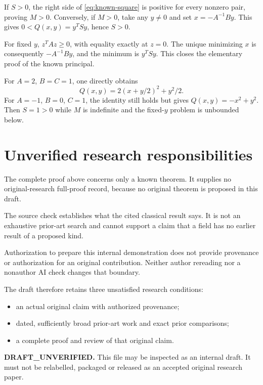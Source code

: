\documentclass[12pt,reqno]{amsart}
\begin{document}
If $S>0$, the right side of \eqref{eq:known-square} is positive for every
nonzero pair, proving $M>0$. Conversely, if $M>0$, take any $y\ne0$
and set $x=-A^{-1}By$. This gives $0<Q(x,y)=y^TSy$, hence $S>0$.

For fixed $y$, $z^TAz\geq0$, with equality exactly at $z=0$.
The unique minimizing $x$ is consequently $-A^{-1}By$, and the minimum
is $y^TSy$. This closes the elementary proof of the known principal.

For $A=2$, $B=C=1$, one directly obtains
\[
 Q(x,y)=2(x+y/2)^2+y^2/2.
\]
For $A=-1$, $B=0$, $C=1$, the identity still holds but gives
$Q(x,y)=-x^2+y^2$. Then $S=1>0$ while $M$ is indefinite and the
fixed-$y$ problem is unbounded below.

\section{Unverified research responsibilities}
The complete proof above concerns only a known theorem. It supplies no
original-research full-proof record, because no original theorem is
proposed in this draft.

The source check establishes what the cited classical result says.
It is not an exhaustive prior-art search and cannot support a claim
that a field has no earlier result of a proposed kind.

Authorization to prepare this internal demonstration does not provide
provenance or authorization for an original contribution. Neither author
rereading nor a nonauthor AI check changes that boundary.

The draft therefore retains three unsatisfied research conditions:
\begin{itemize}
\item an actual original claim with authorized provenance;
\item dated, sufficiently broad prior-art work and exact prior comparisons;
\item a complete proof and review of that original claim.
\end{itemize}
\noindent\textbf{DRAFT\_UNVERIFIED.} This file may be inspected as an
internal draft. It must not be relabelled, packaged or released as an
accepted original research paper.



\end{document}
